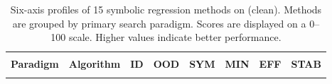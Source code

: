 \begin{table}[t]
\centering
\begingroup


\setlength{\abovecaptionskip}{5pt}
\setlength{\belowcaptionskip}{7pt}
\caption{Six-axis profiles of 15 symbolic regression methods on \core{} (clean).
Methods are grouped by primary search paradigm.
Scores are displayed on a 0--100 scale. Higher values indicate better performance.}
\label{tab:six_axis_profiles}

\fontsize{9}{11.5}\selectfont
\color{SATableInk}
\renewcommand{\arraystretch}{1.35}
\setlength{\tabcolsep}{0pt}
\setlength{\heavyrulewidth}{0.8pt}
\setlength{\lightrulewidth}{0.3pt}
\setlength{\cmidrulewidth}{0.3pt}
\setlength{\aboverulesep}{2.2pt}
\setlength{\belowrulesep}{2.2pt}

\edef\SAParadigmWidth{\the\dimexpr 0.19\linewidth\relax}
\edef\SAAlgorithmWidth{\the\dimexpr 0.14\linewidth\relax}
\edef\SAScoreWidth{\the\dimexpr(\linewidth-\SAParadigmWidth-\SAAlgorithmWidth)/6\relax}
\edef\SAHighlightWidth{\the\dimexpr\SAScoreWidth-11pt\relax}

\newcommand{\SAHighlight}[3]{%
  \begingroup
  \setlength{\fboxsep}{1.4pt}%
  \colorbox{#1}{\makebox[\SAHighlightWidth][c]{\textcolor{#2}{\bfseries\strut #3}}}%
  \endgroup
}
\newcommand{\SABest}[1]{\SAHighlight{SABestBackground}{SABestInk}{#1}}
\newcommand{\SASecond}[1]{\SAHighlight{SASecondBackground}{SASecondInk}{#1}}
\newcommand{\SAGroup}[2]{%
  \multirow{#1}{\SAParadigmWidth}{%
    \color{SATableMuted}\fontsize{8.5}{10.8}\selectfont\raggedright #2}%
}
\newcommand{\SASeparator}{\arrayrulecolor{SATableRule}\midrule\arrayrulecolor{SATableInk}}

\begin{tabular}{@{}
  >{\raggedright\arraybackslash}m{\SAParadigmWidth}
  >{\raggedright\arraybackslash}m{\SAAlgorithmWidth}
  *{6}{>{\centering\arraybackslash}m{\SAScoreWidth}}
@{}}
\arrayrulecolor{SATableInk}
\toprule
& & \multicolumn{2}{c}{\textbf{Numerical}}
    & \multicolumn{2}{c}{\textbf{Symbolic}}
    & \multicolumn{2}{c}{\textbf{Search}} \\
\arrayrulecolor{SATableRule}
\cmidrule(l{3pt}r{3pt}){3-4}
\cmidrule(l{3pt}r{3pt}){5-6}
\cmidrule(l{3pt}r{3pt}){7-8}
\textbf{Paradigm} & \textbf{Algorithm}
  & \textbf{ID} & \textbf{OOD} & \textbf{SYM}
  & \textbf{MIN} & \textbf{EFF} & \textbf{STAB} \\
\midrule
\arrayrulecolor{SATableInk}


\end{tabular}
\end{table}
